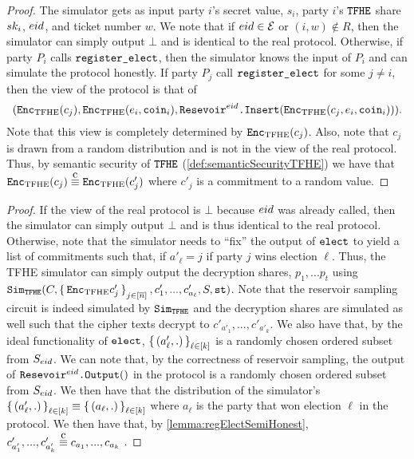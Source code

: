 \begin{lemma}
	\label{lemma:regElectSemiHonest}
	\begin{proof}
		The simulator gets as input party $i$'s secret value, $s_i$, party $i$'s ${\texttt{TFHE}}$ share $sk_i$,
		${eid}$, and ticket number $w$. We note that if ${eid} \in \mathcal{E}$ or $(i, w) \notin R$, then the simulator can simply output $\bot$ and
		is identical to the real protocol.
		Otherwise, if party $P_i$ calls $\texttt{register\_elect}$, then the simulator knows the input of $P_i$ and can simulate the protocol
		honestly. If party $P_j$ call $\texttt{register\_elect}$ for some $j \neq i$, then the view of the protocol
		is that of $$(\texttt{Enc}_{\mathrm{TFHE}}(c_j), \texttt{Enc}_{\mathrm{TFHE}}(e_i, \texttt{coin}_i), \texttt{Resevoir}^{{eid}}\texttt{.Insert}(\texttt{Enc}_{\mathrm{TFHE}}(c_j, e_i, \texttt{coin}_i))).$$
		Note that this view is completely determined by $\texttt{Enc}_{\mathrm{TFHE}}(c_j)$. Also, note that $c_j$ is drawn
		from a random distribution and is not in the view of the real protocol. Thus, 
		by semantic security of ${\texttt{TFHE}}$ (\cref{def:semanticSecurityTFHE}) we have that
		$\Enc(c_j) \compInd \Enc(c'_j)$ where $c'_j$ is a commitment to a random value.
	\end{proof}
\end{lemma}

\begin{lemma}
\begin{proof}
	If the view of the real protocol is $\bot$ because ${eid}$ was already called, then the simulator can simply output $\bot$
	and is thus identical to the real protocol.
	Otherwise, note that the simulator needs to ``fix'' the output of $\texttt{elect}$ to yield
	a list of commitments such that, if $a'_\ell = j$ if party $j$ wins election $\ell$.
	Thus, the TFHE simulator can simply output the decryption shares, $p_1, ... p_t$ using $\texttt{Sim}_{{\texttt{TFHE}}}(C, \set{\texttt{Enc}_{\mathrm{TFHE}}{c'_j}}_{j \in [\overline{n}]}, c'_1, ..., c'_{a_\ell}, S, \texttt{st})$.
	Note that the reservoir sampling circuit is indeed simulated by $\texttt{Sim}_{{\texttt{TFHE}}}$
	and the decryption shares are simulated as well such that the cipher texts decrypt
	to $c'_{a'_1}, ..., c'_{a'_k}$. 
	We also have that, by the ideal functionality of $\texttt{elect}$, $\set{(a'_\ell, .)}_{\ell \in [k]}$ is a randomly chosen
	ordered subset from $S_{eid}$. We can note that, by the correctness of reservoir sampling,
	the output of $\texttt{Resevoir}^{{eid}}\texttt{.Output}()$ in the protocol is a randomly chosen ordered subset from $S_{eid}$.
	We then have that the distribution of the simulator's $\set{(a'_\ell, .)}_{\ell \in [k]} \equiv \set{(a_\ell, .)}_{\ell \in [k]}$
	where $a_\ell$ is the party that won election $\ell$ in the protocol.
	We then have that, by \cref{lemma:regElectSemiHonest}, $c'_{a'_1}, ..., c'_{a'_k} \compInd c_{a_1}, ..., c_{a_k}$ .
\end{proof}	
\end{lemma}


